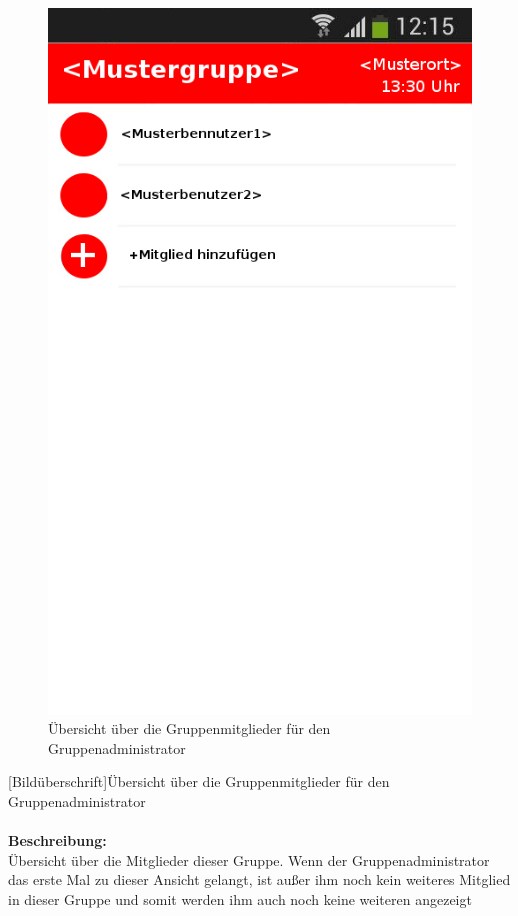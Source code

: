 \begin{figure} [H]
	\caption{Übersicht über die Gruppenmitglieder für den Gruppenadministrator}
	\includegraphics[scale =0.5]{resources/images/gruppendetails_Admin.png}
\end{figure}
[Bildüberschrift]Übersicht über die Gruppenmitglieder für den Gruppenadministrator\\ \\
\textbf{Beschreibung:}\\
Übersicht über die Mitglieder dieser Gruppe. Wenn der Gruppenadministrator das erste Mal zu dieser Ansicht gelangt, ist außer ihm noch kein weiteres Mitglied in dieser Gruppe und somit werden ihm auch noch keine weiteren angezeigt\\

